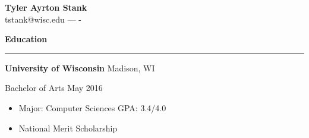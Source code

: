 \documentclass[12pt,letterpaper]{article}
\newenvironment{details}{
    \vspace{-.8em}
    \begin{itemize}
        \renewcommand \labelitemi{\labelitemiv}
        \setlength{\itemsep}{0pt}
        \setlength{\parskip}{-1pt}
        \setlength{\parsep}{0pt}
    }{
    \end{itemize}
    \vspace{-.5em}
}
\newcommand{\hr} {
    \vspace{-1em}
    \par\rule{\textwidth}{1pt}
    \vspace{-1.5em}
}
\newcommand{\ressection}[1] {
    \par{\large \textbf{#1}}
    \hr
}
\newenvironment{education} {
    \ressection{Education}
}{
    \vspace{0.5em}
}
\newcommand{\educator}[4] {
    \textbf{#1}
    \hfill #2
    \par #3 \hfill #4
    \par%
}
\begin{document}
\thispagestyle{empty}

\begin{centering}
    {\large \textbf{Tyler Ayrton Stank}}\\
    tstank@wisc.edu ---  -\\
\end{centering}

\begin{education}

\educator{University of Wisconsin}{Madison, WI}{Bachelor of Arts}{May 2016}
\begin{details}
    \item Major: Computer Sciences \hfill GPA: 3.4/4.0
    \item National Merit Scholarship
\end{details}

\end{education}
\end{document}
